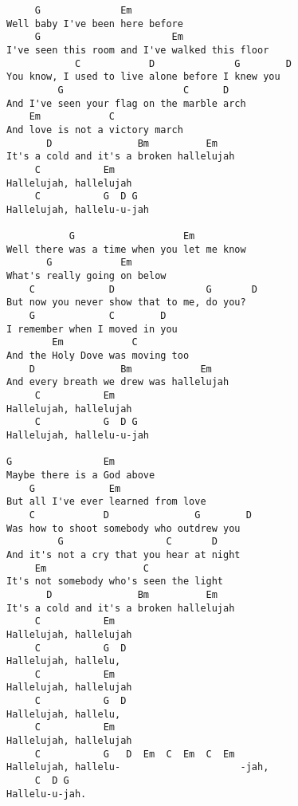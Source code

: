 \documentclass[leqno]{memoir}
\begin{document}
\begin{verbatim}
     G              Em
Well baby I've been here before 
     G                       Em
I've seen this room and I've walked this floor 
            C            D              G        D            
You know, I used to live alone before I knew you 
         G                     C      D
And I've seen your flag on the marble arch 
    Em            C
And love is not a victory march 
       D               Bm          Em
It's a cold and it's a broken hallelujah 
     C           Em
Hallelujah, hallelujah
     C           G  D G
Hallelujah, hallelu-u-jah 

           G                   Em
Well there was a time when you let me know 
       G            Em
What's really going on below 
    C             D                G       D
But now you never show that to me, do you? 
    G             C        D
I remember when I moved in you 
        Em            C
And the Holy Dove was moving too
    D               Bm            Em
And every breath we drew was hallelujah
     C           Em
Hallelujah, hallelujah
     C           G  D G
Hallelujah, hallelu-u-jah 

G                Em
Maybe there is a God above 
    G             Em
But all I've ever learned from love 
    C            D               G        D
Was how to shoot somebody who outdrew you 
         G                  C       D
And it's not a cry that you hear at night
     Em                 C 
It's not somebody who's seen the light
       D               Bm          Em 
It's a cold and it's a broken hallelujah 
     C           Em
Hallelujah, hallelujah
     C           G  D
Hallelujah, hallelu,
     C           Em
Hallelujah, hallelujah
     C           G  D
Hallelujah, hallelu,
     C           Em
Hallelujah, hallelujah
     C           G   D  Em  C  Em  C  Em
Hallelujah, hallelu-                     -jah,
     C  D G
Hallelu-u-jah. 

\end{verbatim}
\newpage
\end{document}
